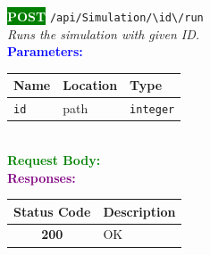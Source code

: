 \begin{tcolorbox}[
    colback=green!5,
    colframe=green,
    arc=2mm,
    boxrule=1pt,
    left=5pt,
    right=5pt,
    top=5pt,
    bottom=5pt
]
\noindent\colorbox{green}{\textcolor{white}{\textbf{POST}}} 
\texttt{\large /api/Simulation/\textbackslash{}{id\textbackslash{}}/run}\\[0.3em]
\textit{Runs the simulation with given ID.}\\[0.3em]
\vspace{0.3em}
\textbf{\textcolor{blue}{Parameters:}}\\[0.2em]
\begin{tabular}{|l|l|l|}
\hline
\rowcolor{gray!20}
\textbf{Name} & \textbf{Location} & \textbf{Type} \\ \hline
\texttt{id} & path & \texttt{integer} \\ \hline
\end{tabular}\\[0.5em]
\vspace{0.3em}
\textbf{\textcolor{green}{Request Body:}}\\[0.2em]
\vspace{0.3em}
\textbf{\textcolor{purple}{Responses:}}\\[0.2em]
\begin{tabular}{|c|p{10cm}|}
\hline
\rowcolor{gray!20}
\textbf{Status Code} & \textbf{Description} \\ \hline
\colorbox{green!20}{\textbf{200}} & OK \\ \hline
\end{tabular}
\end{tcolorbox}
\vspace{0.5em}

